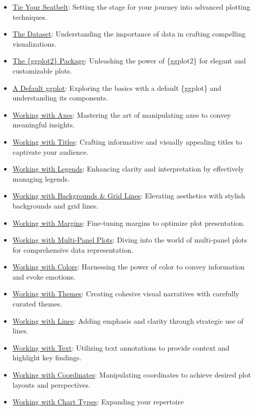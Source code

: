 \documentclass[
  letterpaper,
  DIV=11,
  numbers=noendperiod]{scrreprt}
\providecommand{\tightlist}{%
  \setlength{\itemsep}{0pt}\setlength{\parskip}{0pt}}\usepackage{longtable,booktabs,array}
\begin{document}
\begin{itemize}
\tightlist
\item
  \hyperref[prep]{Tie Your Seatbelt}: Setting the stage for your journey
  into advanced plotting techniques.
\item
  \hyperref[data]{The Dataset}: Understanding the importance of data in
  crafting compelling visualizations.
\item
  \hyperref[ggplot]{The \{ggplot2\} Package}: Unleashing the power of
  \{ggplot2\} for elegant and customizable plots.
\item
  \hyperref[default]{A Default ggplot}: Exploring the basics with a
  default \{ggplot\} and understanding its components.
\item
  \hyperref[axes]{Working with Axes}: Mastering the art of manipulating
  axes to convey meaningful insights.
\item
  \hyperref[titles]{Working with Titles}: Crafting informative and
  visually appealing titles to captivate your audience.
\item
  \hyperref[legends]{Working with Legends}: Enhancing clarity and
  interpretation by effectively managing legends.
\item
  \hyperref[style]{Working with Backgrounds \& Grid Lines}: Elevating
  aesthetics with stylish backgrounds and grid lines.
\item
  \hyperref[margins]{Working with Margins}: Fine-tuning margins to
  optimize plot presentation.
\item
  \hyperref[panels]{Working with Multi-Panel Plots}: Diving into the
  world of multi-panel plots for comprehensive data representation.
\item
  \hyperref[colors]{Working with Colors}: Harnessing the power of color
  to convey information and evoke emotions.
\item
  \hyperref[themes]{Working with Themes}: Creating cohesive visual
  narratives with carefully curated themes.
\item
  \hyperref[lines]{Working with Lines}: Adding emphasis and clarity
  through strategic use of lines.
\item
  \hyperref[text]{Working with Text}: Utilizing text annotations to
  provide context and highlight key findings.
\item
  \hyperref[coords]{Working with Coordinates}: Manipulating coordinates
  to achieve desired plot layouts and perspectives.
\item
  \hyperref[charts]{Working with Chart Types}: Expanding your repertoire

\end{itemize}
\end{document}
